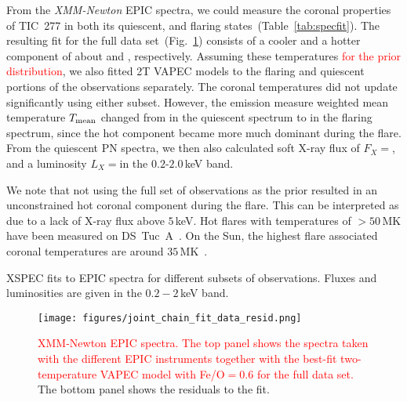 \documentclass[twocolumn]{aastex631}
\begin{document}
From the \textit{XMM-Newton} EPIC spectra, we could measure the coronal properties of TIC~277 in both its quiescent, and flaring states~(Table~\ref{tab:specfit}). The resulting fit for the full data set~(Fig.~\ref{fig:spec_joint_all}) consists of a cooler and a hotter component of about \Tcool and \Thot\hspace{-1.cm}, respectively. Assuming these temperatures \textcolor{red}{for the prior distribution}, we also fitted 2T VAPEC models to the flaring and quiescent portions of the observations separately. The coronal temperatures did not update significantly using either subset. However, the emission measure weighted mean temperature $T_{\rm mean}$ changed from \Tqmean in the quiescent spectrum to \Tfmean in the flaring spectrum, since the hot component became more much dominant during the flare. From the quiescent PN spectra, we then also calculated soft X-ray flux of $F_X=$\FX, and a luminosity $L_X=$\LXquiet in the $0.2$-$2.0\,$keV band. %

We note that not using the full set of observations as the prior resulted in an unconstrained hot coronal component during the flare. This can be interpreted as due to a lack of X-ray flux above $5\,$keV. Hot flares with temperatures of $>50\,$MK have been measured on DS~Tuc~A~\citep{pillitteri2011xray}. On the Sun, the highest flare associated coronal temperatures are around $35\,$MK~\citep{kay2003soft}.


 \begin{table}
\footnotesize
\centering
    \caption{XSPEC fits to EPIC spectra for different subsets of observations. Fluxes and luminosities are given in the $0.2-2\,$keV band.}
    
        \label{tab:specfit}
\end{table}


\begin{figure}
    \begin{centering}
        \texttt{[image: figures/joint\_chain\_fit\_data\_resid.png]}
        \caption{
         \textcolor{red}{XMM-Newton EPIC spectra. The top panel shows the spectra taken with the different EPIC instruments together with the best-fit two-temperature VAPEC model with Fe/O$=0.6$ for the full data set.} The bottom panel shows the residuals to the fit.
        }
        \label{fig:spec_joint_all}
    \end{centering}
\end{figure}
\end{document}
